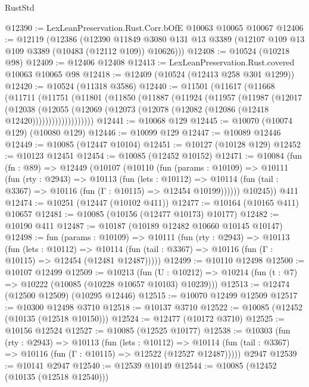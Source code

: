\begin{lexlean}{RustStd}
\begin{coremodule}
@12390 := LexLeanPreservation.Rust.Corr.bOfE @10063 @10065 @10067
@12406 := @12119
    (@12386
      (@12390
        @11849
        @3080
        @131
        @13
        @3389
        (@12107 @109 @13 @109 @3389 (@10483 (@12112 @109)) @10626)))
@12408 := @10524 (@10218 @98)
@12409 := @12406 @12408
@12413 := LexLeanPreservation.Rust.covered @10063 @10065 @98
@12418 := @12409 (@10524 (@12413 @258 @301 @1299))
@12420 := @10524 (@11318 @3586)
@12440 := @11501
    (@11617
      (@11668
        (@11711
          (@11751
            (@11801
              (@11850
                (@11887
                  (@11924
                    (@11957
                      (@11987
                        (@12017
                          (@12038
                            (@12055
                              (@12069
                                (@12073 (@12078 (@12082 (@12086 (@12418 @12420)))))))))))))))))))
@12441 := @10068 @129
@12445 := @10070 (@10074 @129) (@10080 @129)
@12446 := @10099 @129
@12447 := @10089 @12446
@12449 := @10085 (@12447 @10104)
@12451 := @10127 (@10128 @129)
@12452 := @10123 @12451
@12454 := @10085 (@12452 @10152)
@12471 := @10084
    (fun (fn : @89) =>
    @12449
      (@10107
        (@10110
          (fun (params : @10109) =>
          @10111
            (fun (rty : @2943) =>
            @10113
              (fun (lets : @10112) =>
              @10114 (fun (tail : @3367) => @10116 (fun (Γ : @10115) => @12454 @10199))))))
        @10245))
    @411
@12474 := @10251 (@12447 (@10102 @411))
@12477 := @10164 (@10165 @411) @10657
@12481 := @10085 (@10156 (@12477 @10173) @10177)
@12482 := @10190 @411
@12487 := @10187 (@10189 @12482 @10660 @10145 @10147)
@12498 := fun (params : @10109) =>
  @10111
    (fun (rty : @2943) =>
    @10113
      (fun (lets : @10112) =>
      @10114 (fun (tail : @3367) => @10116 (fun (Γ : @10115) => @12454 (@12481 @12487)))))
@12499 := @10110 @12498
@12500 := @10107 @12499
@12509 := @10213
    (fun (U : @10212) => @10214 (fun (t : @7) => @10222 (@10085 (@10228 @10657 @10103) @10239)))
@12513 := @12474 (@12500 @12509) (@10295 @12446)
@12515 := @10070 @12499 @12509
@12517 := @10300 @12498 @3710
@12518 := @10137 @3710
@12522 := @10085 (@12452 (@10135 (@12518 @10150)))
@12524 := @12477 (@10172 @3710)
@12525 := @10156 @12524
@12527 := @10085 (@12525 @10177)
@12538 := @10303
    (fun (rty : @2943) =>
    @10113
      (fun (lets : @10112) =>
      @10114 (fun (tail : @3367) => @10116 (fun (Γ : @10115) => @12522 (@12527 @12487)))))
    @2947
@12539 := @10141 @2947
@12540 := @12539 @10149
@12544 := @10085 (@12452 (@10135 (@12518 @12540)))

\end{coremodule}
\end{lexlean}
